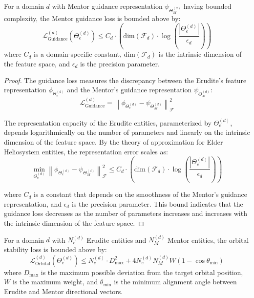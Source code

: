 \begin{theorem}
For a domain $d$ with Mentor guidance representation $\psi_{\Theta_M^{(d)}}$ having bounded complexity, the Mentor guidance loss is bounded above by:
\begin{equation}
\mathcal{L}_{\text{Guidance}}^{(d)}(\Theta_e^{(d)}) \leq C_d \cdot \left(\text{dim}(\mathcal{F}_d) \cdot \log\left(\frac{|\Theta_e^{(d)}|}{\epsilon_d}\right)\right)
\end{equation}
where $C_d$ is a domain-specific constant, $\text{dim}(\mathcal{F}_d)$ is the intrinsic dimension of the feature space, and $\epsilon_d$ is the precision parameter.
\end{theorem}

\begin{proof}
The guidance loss measures the discrepancy between the Erudite's feature representation $\phi_{\Theta_e^{(d)}}$ and the Mentor's guidance representation $\psi_{\Theta_M^{(d)}}$:
\begin{equation}
\mathcal{L}_{\text{Guidance}}^{(d)} = \left\|\phi_{\Theta_e^{(d)}} - \psi_{\Theta_M^{(d)}}\right\|^2_{\mathcal{F}}
\end{equation}

The representation capacity of the Erudite entities, parameterized by $\Theta_e^{(d)}$, depends logarithmically on the number of parameters and linearly on the intrinsic dimension of the feature space. By the theory of approximation for Elder Heliosystem entities, the representation error scales as:
\begin{equation}
\min_{\Theta_e^{(d)}} \left\|\phi_{\Theta_e^{(d)}} - \psi_{\Theta_M^{(d)}}\right\|^2_{\mathcal{F}} \leq C_d \cdot \left(\text{dim}(\mathcal{F}_d) \cdot \log\left(\frac{|\Theta_e^{(d)}|}{\epsilon_d}\right)\right)
\end{equation}

where $C_d$ is a constant that depends on the smoothness of the Mentor's guidance representation, and $\epsilon_d$ is the precision parameter. This bound indicates that the guidance loss decreases as the number of parameters increases and increases with the intrinsic dimension of the feature space.
\end{proof}

\begin{theorem}
For a domain $d$ with $N_e^{(d)}$ Erudite entities and $N_M^{(d)}$ Mentor entities, the orbital stability loss is bounded above by:
\begin{equation}
\mathcal{L}_{\text{Orbital}}^{(d)}(\Theta_e^{(d)}) \leq N_e^{(d)} \cdot D_{\text{max}}^2 + 4N_e^{(d)}N_M^{(d)}W(1 - \cos\theta_{\text{min}})
\end{equation}
where $D_{\text{max}}$ is the maximum possible deviation from the target orbital position, $W$ is the maximum weight, and $\theta_{\text{min}}$ is the minimum alignment angle between Erudite and Mentor directional vectors.
\end{theorem}

